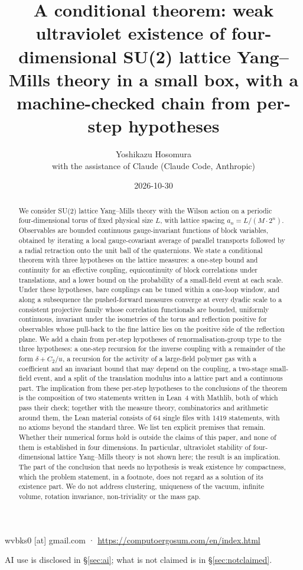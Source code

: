 \documentclass[11pt,a4paper]{article}
\title{A conditional theorem: weak ultraviolet existence of four-dimensional SU(2) lattice Yang--Mills theory in a small box, with a machine-checked chain from per-step hypotheses}
\author{Yoshikazu Hosomura\\[.3em]\normalsize with the assistance of Claude (Claude Code, Anthropic)}
\date{2026-10-30}
\theoremstyle{definition}
\theoremstyle{remark}
\begin{document}
\maketitle
\begin{center}\small wvbks0 [at] gmail.com · \url{https://computoergosum.com/en/index.html}\end{center}
\begin{center}\small AI use is disclosed in \S\ref{sec:ai}; what is not claimed is in \S\ref{sec:notclaimed}.\end{center}

\begin{abstract}
We consider SU(2) lattice Yang--Mills theory with the Wilson action on a periodic four-dimensional torus of fixed physical size $L$, with lattice spacing $a_n=L/(M\cdot2^n)$. Observables are bounded continuous gauge-invariant functions of block variables, obtained by iterating a local gauge-covariant average of parallel transports followed by a radial retraction onto the unit ball of the quaternions. We state a conditional theorem with three hypotheses on the lattice measures: a one-step bound and continuity for an effective coupling, equicontinuity of block correlations under translations, and a lower bound on the probability of a small-field event at each scale. Under these hypotheses, bare couplings can be tuned within a one-loop window, and along a subsequence the pushed-forward measures converge at every dyadic scale to a consistent projective family whose correlation functionals are bounded, uniformly continuous, invariant under the isometries of the torus and reflection positive for observables whose pull-back to the fine lattice lies on the positive side of the reflection plane. We add a chain from per-step hypotheses of renormalisation-group type to the three hypotheses: a one-step recursion for the inverse coupling with a remainder of the form $\delta+C_2/u$, a recursion for the activity of a large-field polymer gas with a coefficient and an invariant bound that may depend on the coupling, a two-stage small-field event, and a split of the translation modulus into a lattice part and a continuous part. The implication from these per-step hypotheses to the conclusions of the theorem is the composition of two statements written in Lean~4 with Mathlib, both of which pass their check; together with the measure theory, combinatorics and arithmetic around them, the Lean material consists of 64 single files with 1419 statements, with no axioms beyond the standard three. We list ten explicit premises that remain. Whether their numerical forms hold is outside the claims of this paper, and none of them is established in four dimensions. In particular, ultraviolet stability of four-dimensional lattice Yang--Mills theory is not shown here; the result is an implication. The part of the conclusion that needs no hypothesis is weak existence by compactness, which the problem statement, in a footnote, does not regard as a solution of its existence part. We do not address clustering, uniqueness of the vacuum, infinite volume, rotation invariance, non-triviality or the mass gap.
\end{abstract}
\end{document}
